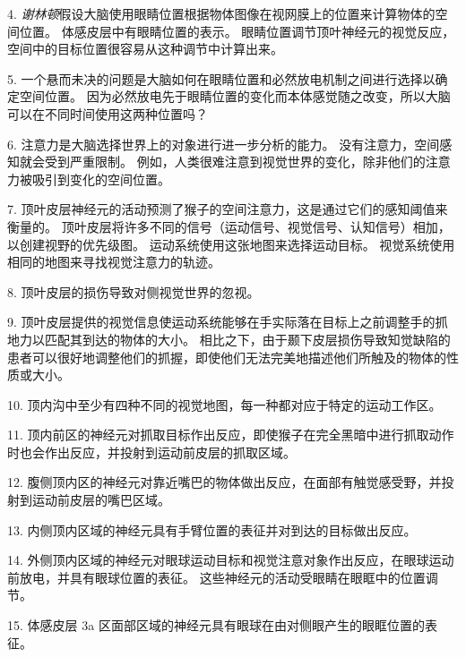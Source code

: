 4. \textit{谢林顿}假设大脑使用眼睛位置根据物体图像在视网膜上的位置来计算物体的空间位置。
体感皮层中有眼睛位置的表示。
眼睛位置调节顶叶神经元的视觉反应，空间中的目标位置很容易从这种调节中计算出来。


5. 一个悬而未决的问题是大脑如何在眼睛位置和必然放电机制之间进行选择以确定空间位置。
因为必然放电先于眼睛位置的变化而本体感觉随之改变，所以大脑可以在不同时间使用这两种位置吗？


6. 注意力是大脑选择世界上的对象进行进一步分析的能力。
没有注意力，空间感知就会受到严重限制。
例如，人类很难注意到视觉世界的变化，除非他们的注意力被吸引到变化的空间位置。


7. 顶叶皮层神经元的活动预测了猴子的空间注意力，这是通过它们的感知阈值来衡量的。
顶叶皮层将许多不同的信号（运动信号、视觉信号、认知信号）相加，以创建视野的优先级图。
运动系统使用这张地图来选择运动目标。
视觉系统使用相同的地图来寻找视觉注意力的轨迹。


8. 顶叶皮层的损伤导致对侧视觉世界的忽视。


9. 顶叶皮层提供的视觉信息使运动系统能够在手实际落在目标上之前调整手的抓地力以匹配其到达的物体的大小。
相比之下，由于颞下皮层损伤导致知觉缺陷的患者可以很好地调整他们的抓握，即使他们无法完美地描述他们所触及的物体的性质或大小。


10. 顶内沟中至少有四种不同的视觉地图，每一种都对应于特定的运动工作区。


11. 顶内前区的神经元对抓取目标作出反应，即使猴子在完全黑暗中进行抓取动作时也会作出反应，并投射到运动前皮层的抓取区域。


12. 腹侧顶内区的神经元对靠近嘴巴的物体做出反应，在面部有触觉感受野，并投射到运动前皮层的嘴巴区域。 


13. 内侧顶内区域的神经元具有手臂位置的表征并对到达的目标做出反应。


14. 外侧顶内区域的神经元对眼球运动目标和视觉注意对象作出反应，在眼球运动前放电，并具有眼球位置的表征。
这些神经元的活动受眼睛在眼眶中的位置调节。


15. 体感皮层 3a 区面部区域的神经元具有眼球在由对侧眼产生的眼眶位置的表征。

